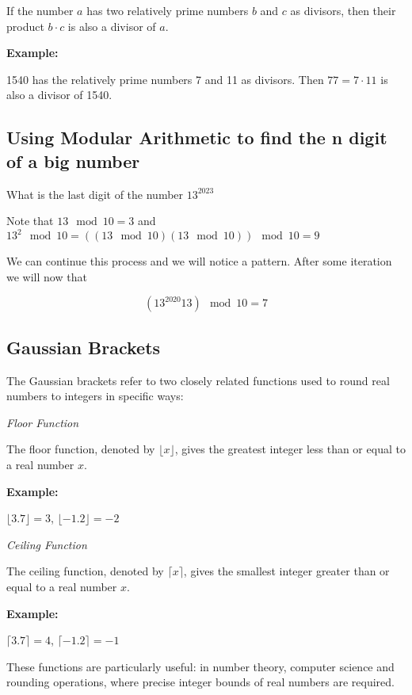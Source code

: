 If the number \( a \) has two relatively prime numbers \( b \) and \( c \) as divisors, then their product \( b \cdot c \) is also a divisor of \( a \). \\
\vspace{\baselineskip}

\textbf{Example:}
\vspace{\baselineskip}


1540 has the relatively prime numbers 7 and 11 as divisors. Then \( 77 = 7 \cdot 11 \) is also a divisor of 1540.

\subsection{Using Modular Arithmetic to find the n digit of a big number}

What is the last digit of the number \(13^{2023}\)

Note that \(13 \mod 10 = 3\) and  \(13^2 \mod 10 =  ((13 \mod 10)  (13\mod 10)) \mod 10 = 9 \)

We can continue this process and we will notice a pattern. After some iteration we will now that

\[(13^{2020} 13) \mod 10 = 7\]

\subsection{Gaussian Brackets}

The Gaussian brackets refer to two closely related functions used to round real numbers to integers in specific ways:

\emph{Floor Function}
\vspace{\baselineskip}

The floor function, denoted by \(\lfloor x \rfloor\), gives the greatest integer less than or equal to a real number \(x\). \\
\vspace{\baselineskip}
    
\textbf{Example:}
\vspace{\baselineskip}
 

\(\lfloor 3.7 \rfloor = 3\), \(\lfloor -1.2 \rfloor = -2\)

\emph{Ceiling Function} 
    
The ceiling function, denoted by \(\lceil x \rceil\), gives the smallest integer greater than or equal to a real number \(x\). \\
\vspace{\baselineskip}

\textbf{Example:}
\vspace{\baselineskip}
 

\(\lceil 3.7 \rceil = 4\), \(\lceil -1.2 \rceil = -1\)
\vspace{\baselineskip}

These functions are particularly useful: in number theory, computer science 
and rounding operations, where precise integer bounds of real numbers are required.

